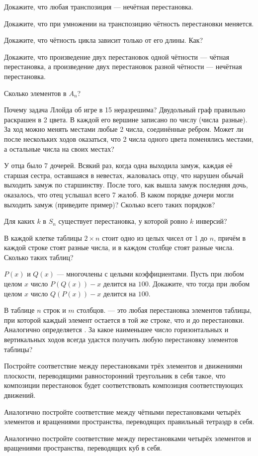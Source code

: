 \documentclass[a4paper, 11pt]{article}
\begin{document}
Докажите, что любая транспозиция --- нечётная перестановка.

Докажите, что при умножении на транспозицию чётность перестановки
меняется.


Докажите, что чётность цикла зависит только от его длины. Как?

Докажите, что произведение двух перестановок одной чётности ---
чётная перестановка, а произведение двух перестановок разной
чётности --- нечётная перестановка.

Сколько элементов в $A_n$?

Почему задача Ллойда об игре в 15 неразрешима?
Двудольный граф правильно раскрашен в 2 цвета.
В каждой его вершине записано по числу (числа~разные).
За ход можно менять местами любые 2 числа, соедин\"енные
ребром. Может ли после нескольких ходов
оказаться, что 2 числа одного цвета поменялись местами,
а остальные числа на своих местах?

У отца было 7 дочерей. Всякий раз, когда одна выходила замуж,
каждая е\"е старшая сестра, оставшаяся в невестах,
жаловалась отцу, что нарушен обычай выходить замуж
по старшинству. После того, как вышла замуж последняя дочь,
оказалось, что отец услышал всего 7 жалоб.
В каком порядке дочери могли выходить замуж
(приведите пример)? Сколько всего таких порядков?

 Для каких $k$ в $S_n$ существует перестановка, у которой
ровно $k$ инверсий?


В каждой клетке таблицы $2\times n$ стоит одно из целых чисел от 1 до $n$,
прич\"ем в каждой строке стоят разные числа, и
в каждом столбце стоят разные числа. Сколько таких таблиц?

$P(x)$ и $Q(x)$ --- многочлены с целыми коэффициентами.
Пусть
при любом целом $x$
число $P(Q(x))-x$ делится на $100$. Докажите, что тогда при любом
целом $x$ число $Q(P(x))-x$ делится на $100$.

В таблице $n$ строк и $m$ столбцов.
 --- это любая
перестановка элементов таблицы, при которой
каждый элемент остается в той же строке, что и до перестановки.
Аналогично определяется . За какое наименьшее
число %
горизонтальных и вертикальных
ходов всегда удастся получить любую перестановку элементов
таблицы?

 Постройте соответствие между перестановками трёх элементов и движениями плоскости, переводящими равносторонний треугольник в себя такое, что композиции перестановок будет соответствовать композиция соответствующих движений.

 Аналогично постройте соответствие между чётными перестановками четырёх элементов и вращениями пространства, переводящих правильный тетраэдр в себя.

 Аналогично постройте соответствие между перестановками четырёх элементов и вращениями пространства, переводящих куб в себя.


\end{document}
